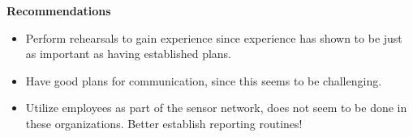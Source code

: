 \textbf{Recommendations}
\begin{itemize}
\item Perform rehearsals to gain experience since experience has shown to be just as important as having established plans.
\item Have good plans for communication, since this seems to be challenging.
\item Utilize employees as part of the sensor network, does not seem to be done in these organizations. Better establish reporting routines!
\end{itemize}

